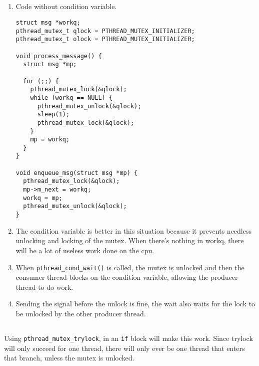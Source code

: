 \documentclass[a4paper,11pt]{article}
\def\code#1{\texttt{#1}}
\begin{document}
\subsection{}
\begin{enumerate}
  \item
    Code without condition variable.
    \begin{lstlisting}
struct msg *workq;
pthread_mutex_t qlock = PTHREAD_MUTEX_INITIALIZER;
pthread_mutex_t olock = PTHREAD_MUTEX_INITIALIZER;

void process_message() {
  struct msg *mp;

  for (;;) {
    pthread_mutex_lock(&qlock);
    while (workq == NULL) {
      pthread_mutex_unlock(&qlock);
      sleep(1);
      pthread_mutex_lock(&qlock);
    }
    mp = workq;
  }
}

void enqueue_msg(struct msg *mp) {
  pthread_mutex_lock(&qlock);
  mp->m_next = workq;
  workq = mp;
  pthread_mutex_unlock(&qlock);
}
\end{lstlisting}
\item The condition variable is better in this situation because it prevents needless unlocking
  and locking of the mutex.
  When there's nothing in workq, there will be a lot of useless work done on the cpu.

\item When \code{pthread\_cond\_wait()} is called, the mutex is unlocked and then the consumer
  thread blocks on the condition variable, allowing the producer thread to do work.

\item Sending the signal before the unlock is fine, the wait also waits for the
  lock to be unlocked by the other producer thread.
\end{enumerate}

\subsection{}
Using \code{pthread\_mutex\_trylock}, in an \code{if} block will make this work.
Since trylock will only succeed for one thread, there will only ever be one thread
that enters that branch, unless the mutex is unlocked.
\end{document}
